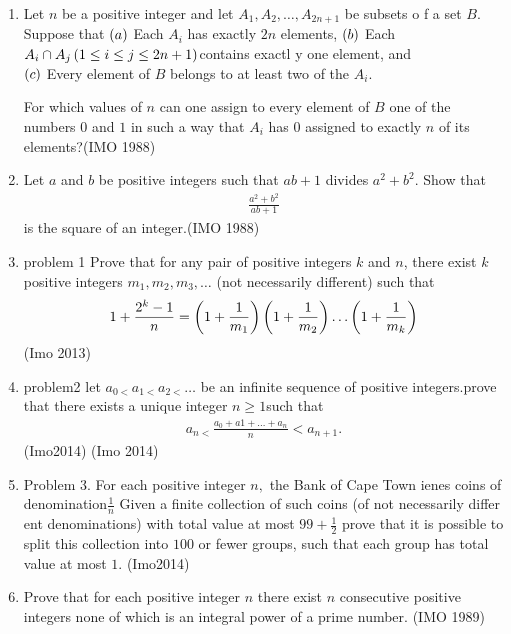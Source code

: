 \begin{enumerate}
\item Let $n$ be a positive integer and let $A_1, A_2, \dots, A_{2n+1}$ be subsets o
    f a set $B$. Suppose that 
                 $\left(a\right)$ Each $A_i$ has exactly $2n$ elements,
                  $\left(b\right)$ Each $A_i \cap A_j \left(1\leq i \leq j\leq 2n+1\right)$contains exactl
    y one element, and \\
                  $\left(c\right)$ Every element of $B$ belongs to at least two of the $A_i$.
                  
                 For which values of $n$ can one assign to every element of $B$ one of the numbers $0$ and $1$ in such a way that $A_i$ has $0$ assigned to exactly $n$ of its elements?\hfill(IMO 1988)
\item Let $a$ and $b$ be positive integers such that $ab + 1$ divides $a^2 + b^2$. Show that 
               \begin{align*} \frac{a^2+b^2}{ab+1} \end{align*} is the square of an integer.\hfill(IMO 1988)
               \item problem 1 Prove that for any pair of positive integers $k$ and $n$, there exist $k$ positive integers $m_1,m_2,m_3,\ldots$
 (not necessarily different) such that
\begin{align}
	1+\frac{2^{k}-1}{n}=\left(1+\frac{1}{m_1}\right)\left(1+\frac{1}{m_2}\right)\ldots\left(1+\frac{1}{m_k}\right)
\end{align}  \hfill(Imo 2013)
 \item problem2 let $a_{0<} a_{1<} a_{2 <} \ldots$ be an infinite sequence of positive integers.prove that there exists a unique integer $n    \geq 1$such that          \begin{align}                                                                                                                                                                             a_{n< }\frac{a_0+a1+\ldots+a_n}{n} < a_{n+1}.                                                                                                                \end{align} \hfill(Imo2014) \hfill(Imo 2014)   
\item Problem 3. For each positive integer $n,$ the Bank of Cape Town ienes coins of denomination$\frac{1}{n}$ Given a finite collection of such coins (of  not  necessarily  differ
    ent  denominations) with total value at most $99 +\frac{1}{2}$ prove that it is possible to split this collection into $100$ or fewer groups, such that each group has total value at most $1$. \hfill(Imo2014)
    \item Prove that for each positive integer $n$ there exist $n$ consecutive positive integers none of which is an integral power of a prime number. \hfill(IMO 1989)


\end{enumerate}
